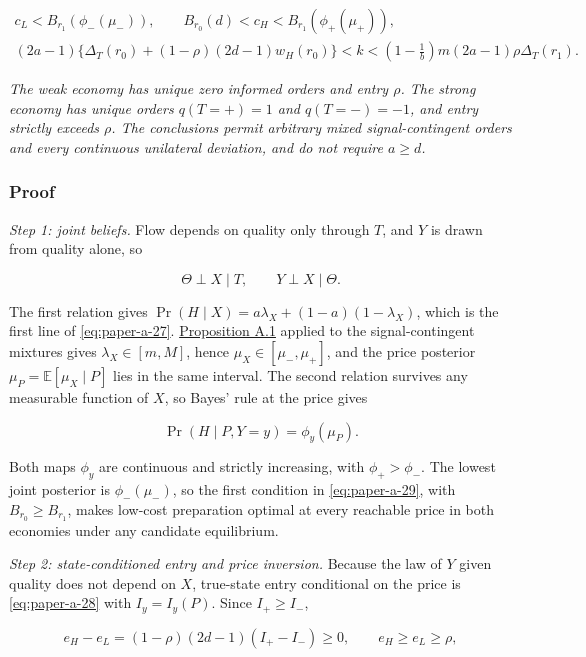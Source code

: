 \documentclass[
  12pt,
]{article}
\begin{document}
\[
\begin{gathered}
c_L<B_{r_1}(\phi_-(\mu_-)),\qquad
B_{r_0}(d)<c_H<B_{r_1}(\phi_+(\mu_+)),\\
(2a-1)\{\Delta_T(r_0)+(1-\rho)(2d-1)w_H(r_0)\}<k
<\left(1-\frac1b\right)m(2a-1)\rho\Delta_T(r_1).
\end{gathered}
\tag{A.29}\label{eq:paper-a-29}
\]

\emph{The weak economy has unique zero informed orders and entry
\(\rho\). The strong economy has unique orders \(q(T=+)=1\) and
\(q(T=-)=-1\), and entry strictly exceeds \(\rho\). The conclusions
permit arbitrary mixed signal-contingent orders and every continuous
unilateral deviation, and do not require \(a\ge d\).}

\subsubsection{Proof}\label{proof}

\emph{Step 1: joint beliefs.} Flow depends on quality only through
\(T\), and \(Y\) is drawn from quality alone, so

\[
\Theta\perp X\mid T,\qquad Y\perp X\mid\Theta .
\tag{A.30}\label{eq:paper-a-30}
\]

The first relation gives \(\Pr(H\mid X)=a\lambda_X+(1-a)(1-\lambda_X)\),
which is the first line of \eqref{eq:paper-a-27}.
\hyperref[result-proposition-a-1]{Proposition A.1} applied to the
signal-contingent mixtures gives \(\lambda_X\in[m,M]\), hence
\(\mu_X\in[\mu_-,\mu_+]\), and the price posterior
\(\mu_P=\mathbb E[\mu_X\mid P]\) lies in the same interval. The second
relation survives any measurable function of \(X\), so Bayes' rule at
the price gives

\[
\Pr(H\mid P,Y=y)=\phi_y(\mu_P).
\tag{A.31}\label{eq:paper-a-31}
\]

Both maps \(\phi_y\) are continuous and strictly increasing, with
\(\phi_+>\phi_-\). The lowest joint posterior is \(\phi_-(\mu_-)\), so
the first condition in \eqref{eq:paper-a-29}, with
\(B_{r_0}\ge B_{r_1}\), makes low-cost preparation optimal at every
reachable price in both economies under any candidate equilibrium.

\emph{Step 2: state-conditioned entry and price inversion.} Because the
law of \(Y\) given quality does not depend on \(X\), true-state entry
conditional on the price is \eqref{eq:paper-a-28} with \(I_y=I_y(P)\).
Since \(I_+\ge I_-\),

\[
e_H-e_L=(1-\rho)(2d-1)(I_+-I_-)\ge0,\qquad e_H\ge e_L\ge\rho,
\tag{A.32}\label{eq:paper-a-32}
\]
\end{document}
